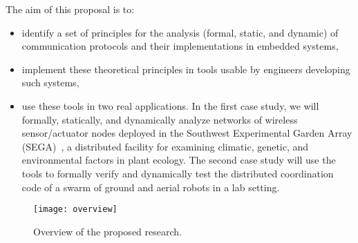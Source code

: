 The aim of this proposal is to:
\begin{itemize}
\item identify a set of principles for the analysis (formal, static,
  and dynamic) of communication protocols and
  their implementations in embedded systems,
\item implement these theoretical principles in tools usable by
  engineers developing such systems,
\item use these tools in two real applications.
  In the first case study, we will formally, statically, and dynamically analyze networks
  of wireless sensor/actuator nodes deployed in the Southwest Experimental Garden
  Array (SEGA)~\cite{YamEtAl10,FliEtAl12}, a distributed facility for
  examining climatic, genetic, and environmental factors in plant ecology.
  The second case study will use the tools to formally verify and dynamically test the distributed coordination code of a swarm of ground and aerial robots in a lab setting.
\end{itemize}


\begin{figure}[!t]
  \centering
  \texttt{[image: overview]}
  \caption{Overview of the proposed research.}
  \label{fig:overview}
\end{figure}

